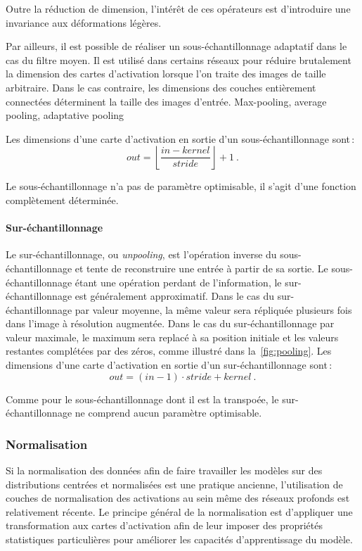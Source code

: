 Outre la réduction de dimension, l'intérêt de ces opérateurs est d'introduire une invariance aux déformations légères.

Par ailleurs, il est possible de réaliser un sous-échantillonnage adaptatif dans le cas du filtre moyen. Il est utilisé dans certains réseaux pour réduire brutalement la dimension des cartes d'activation lorsque l'on traite des images de taille arbitraire. Dans le cas contraire, les dimensions des couches entièrement connectées déterminent la taille des images d'entrée.
Max-pooling, average pooling, adaptative pooling

Les dimensions d'une carte d'activation en sortie d'un sous-échantillonnage sont\,:
$$\mathit{out} = \left\lfloor \frac{\mathit{in} - \mathit{kernel}}{\mathit{stride}}\right\rfloor + 1~.$$

Le sous-échantillonnage n'a pas de paramètre optimisable, il s'agit d'une fonction complètement déterminée.

\paragraph{Sur-échantillonnage}

Le sur-échantillonnage, ou \emph{unpooling}, est l'opération inverse du sous-échantillonnage et tente de reconstruire une entrée à partir de sa sortie. Le sous-échantillonnage étant une opération perdant de l'information, le sur-échantillonnage est généralement approximatif. Dans le cas du sur-échantillonnage par valeur moyenne, la même valeur sera répliquée plusieurs fois dans l'image à résolution augmentée. Dans le cas du sur-échantillonnage par valeur maximale, le maximum sera replacé à sa position initiale et les valeurs restantes complétées par des zéros, comme illustré dans la~\cref{fig:pooling}.
Les dimensions d'une carte d'activation en sortie d'un sur-échantillonnage sont\,:
$$\mathit{out} = (\mathit{in} - 1) \cdot \mathit{stride} + \mathit{kernel}~.$$

Comme pour le sous-échantillonnage dont il est la transpoée, le sur-échantillonnage ne comprend aucun paramètre optimisable.

\subsubsection{Normalisation}

Si la normalisation des données afin de faire travailler les modèles sur des distributions centrées et normalisées est une pratique ancienne, l'utilisation de couches de normalisation des activations au sein même des réseaux profonds est relativement récente. Le principe général de la normalisation est d'appliquer une transformation aux cartes d'activation afin de leur imposer des propriétés statistiques particulières pour améliorer les capacités d'apprentissage du modèle.

